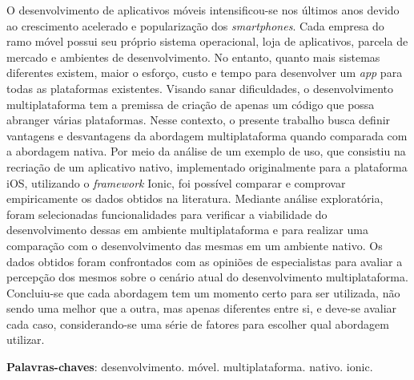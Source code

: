 \begin{resumo}

 O desenvolvimento de aplicativos móveis intensificou-se nos últimos anos devido ao crescimento acelerado e popularização dos 
 \textit{smartphones}. Cada empresa do ramo móvel possui seu próprio sistema operacional, loja de aplicativos, parcela de mercado
  e ambientes de desenvolvimento. No entanto, quanto mais sistemas diferentes existem, maior o esforço, custo e tempo para 
  desenvolver um \textit{app} para todas as plataformas existentes.
 Visando sanar dificuldades, o desenvolvimento multiplataforma tem a premissa de criação de apenas um código que possa abranger 
 várias plataformas. 
 Nesse contexto, o presente trabalho busca definir vantagens e desvantagens da abordagem multiplataforma 
 quando comparada com a abordagem nativa. 
 Por meio da análise de um exemplo de uso, que consistiu na recriação de um aplicativo 
 nativo, implementado originalmente para a plataforma iOS, utilizando o \textit{framework} Ionic, foi possível comparar e 
 comprovar empiricamente os dados obtidos na literatura. 
 Mediante análise exploratória, foram selecionadas funcionalidades para verificar a viabilidade do desenvolvimento dessas
 em ambiente multiplataforma e para realizar uma comparação com o desenvolvimento das mesmas em um ambiente nativo. Os dados 
 obtidos foram confrontados com as opiniões de especialistas para avaliar a percepção dos mesmos sobre o cenário atual do 
 desenvolvimento multiplataforma. Concluiu-se que cada abordagem tem um momento certo 
 para ser utilizada, não sendo uma melhor que a outra, mas apenas diferentes entre si, e deve-se avaliar cada caso, 
 considerando-se uma série de fatores para escolher qual abordagem utilizar.

 \vspace{\onelineskip}
    
 \noindent
 \textbf{Palavras-chaves}: desenvolvimento. móvel. multiplataforma. nativo. ionic. 
\end{resumo}
